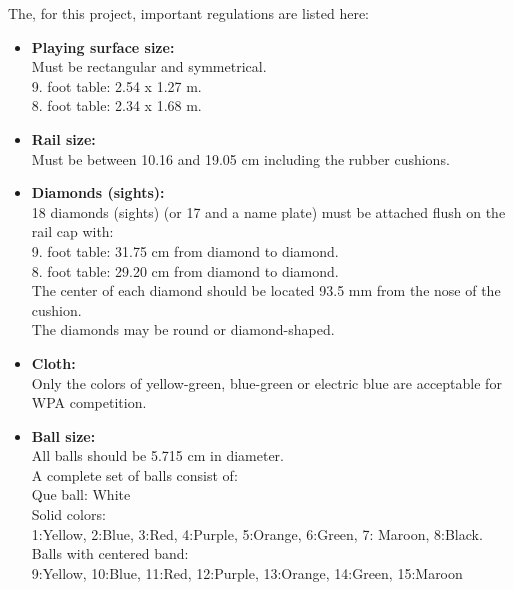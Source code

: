 The, for this project, important regulations are listed here:
\begin{itemize}
	\item \textbf{Playing surface size:}\\
		Must be rectangular and symmetrical.\\
		9. foot table: 2.54 x 1.27 m.\\
		8. foot table: 2.34 x 1.68 m.\\
	\item \textbf{Rail size:}\\
		Must be between 10.16 and 19.05 cm including the rubber cushions.\\
	\item \textbf{Diamonds (sights):}\\
		18 diamonds (sights) (or 17 and a name plate) must be attached flush on the rail cap with:\\
		9. foot table: 31.75 cm from diamond to diamond.\\
		8. foot table: 29.20 cm from diamond to diamond.\\
		The center of each diamond should be located 93.5 mm from the nose of the cushion.\\
		The diamonds may be round or diamond-shaped.\\
	\item \textbf{Cloth:}\\
		Only the colors of yellow-green, blue-green or electric blue are acceptable for WPA competition. \\
	\item \textbf{Ball size:}\\
		All balls should be 5.715 cm in diameter.\\
		A complete set of balls consist of:\\
		Que ball: White\\
		Solid colors:\\
		\hspace*{10 mm}	1:Yellow, 2:Blue, 3:Red, 4:Purple, 5:Orange, 6:Green, 7: Maroon, 8:Black.\\
		Balls with centered band:\\
		\hspace*{10 mm}	9:Yellow, 10:Blue, 11:Red, 12:Purple, 13:Orange, 14:Green, 15:Maroon\\


	

\end{itemize}